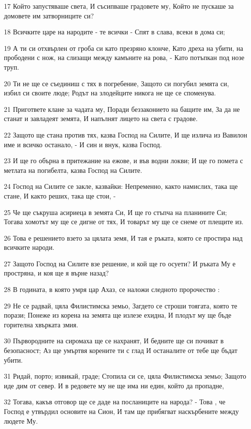 \par 17 Който запустяваше света, И съсипваше градовете му, Който не пускаше за домовете им затворниците си?
\par 18 Всичките царе на народите - те всички - Спят в слава, всеки в дома си;
\par 19 А ти си отхвърлен от гроба си като презряно клонче, Като дреха на убити, на прободени с нож, на слизащи между камъните на рова, - Като потъпкан под нозе труп.
\par 20 Ти не ще се съединиш с тях в погребение, Защото си погубил земята си, избил си своите люде; Родът на злодейците никога не ще се споменува.
\par 21 Пригответе клане за чадата му, Поради беззаконието на бащите им, За да не станат и завладеят земята, И напълнят лицето на света с градове.
\par 22 Защото ще стана против тях, казва Господ на Силите, И ще излича из Вавилон име и всичко останало, - И син и внук, казва Господ.
\par 23 И ще го обърна в притежание на ежове, и във водни локви; И ще го помета с метлата на погибелта, казва Господ на Силите.
\par 24 Господ на Силите се закле, казвайки: Непременно, както намислих, така ще стане, И както реших, така ще стои, -
\par 25 Че ще съкруша асириеца в земята Си, И ще го стъпча на планините Си; Тогава хомотът му ще се дигне от тях, И товарът му ще се снеме от плещите из.
\par 26 Това е решението взето за цялата земя, И тая е ръката, която се простира над всичките народи.
\par 27 Защото Господ на Силите взе решение, и кой ще го осуети? И ръката Му е простряна, и коя ще я върне назад?
\par 28 В годината, в която умря цар Ахаз, се наложи следното пророчество :
\par 29 Не се радвай, цяла Филистимска земьо, Загдето се строши тоягата, която те порази; Понеже из корена на земята ще излезе ехидна, И плодът му ще бъде горителна хвърката змия.
\par 30 Първородните на сиромаха ще се нахранят, И бедните ще си почиват в безопасност; Аз ще умъртвя корените ти с глад И останалите от тебе ще бъдат убити.
\par 31 Ридай, порто; извикай, граде; Стопила си се, цяла Филистимска земьо; Защото иде дим от север. И в редовете му не ще има ни един, който да пропадне,
\par 32 Тогава, какъв отговор ще се даде на посланиците на народа? - Това , че Господ е утвърдил основите на Сион, И там ще прибягват наскърбените между людете Му.

